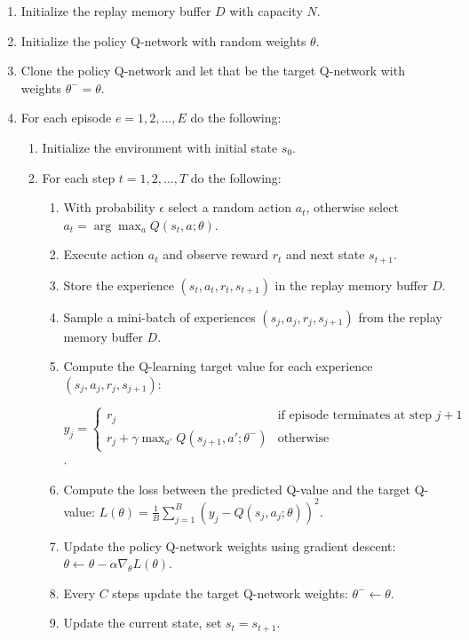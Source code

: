 \documentclass[12pt,oneside]{article}
\begin{document}
\begin{enumerate}
\item  \label{itm:dqn_1} Initialize the replay memory buffer $D$ with capacity $N$.
\item Initialize the policy Q-network with random weights $\theta$.
\item Clone the policy Q-network and let that be the target Q-network with weights $\theta^{-} = \theta$.
\item For each episode $e=1,2,...,E$ do the following:
	\begin{enumerate}
	\item Initialize the environment with initial state $s_0$.
	\item For each step $t=1,2,...,T$ do the following:
		\begin{enumerate}
		\item With probability $\epsilon$ select a random action $a_t$, otherwise select $a_t=\arg\max_{a} Q(s_t, a; \theta)$.
		\item Execute action $a_t$ and observe reward $r_t$ and next state $s_{t+1}$.
		\item Store the experience $(s_t, a_t, r_t, s_{t+1})$ in the replay memory buffer $D$.
		\item Sample a mini-batch of experiences $(s_j, a_j, r_j, s_{j+1})$ from the replay memory buffer $D$.
		
		\item Compute the Q-learning target value for each experience $(s_j, a_j, r_j, s_{j+1})$:
		
		 $y_j = 
		 \begin{cases} 
		 r_j & \text{if episode terminates at step } j+1 \\ 
		 r_j + \gamma\max_{a'}Q(s_{j+1},a';\theta^{-}) & \text{otherwise} \end{cases}$.
		
		\item Compute the loss between the predicted Q-value and the target Q-value: $L(\theta) = \frac{1}{B}\sum_{j=1}^B(y_j-Q(s_j,a_j;\theta))^2$.
		\item Update the policy Q-network weights using gradient descent: $\theta \leftarrow \theta - \alpha\nabla_\theta L(\theta)$.
		\item Every $C$ steps update the target Q-network weights: $\theta^{-} \leftarrow \theta$.
		\item Update the current state, set $s_t=s_{t+1}$.
		\end{enumerate}
	\end{enumerate}
\end{enumerate}
\end{document}

